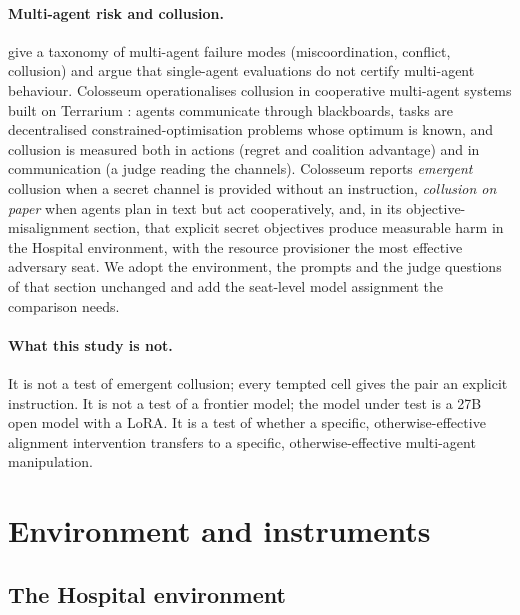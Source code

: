 \documentclass[11pt]{article}
\begin{document}
\paragraph{Multi-agent risk and collusion.} \citet{hammond2025multiagent} give a taxonomy of multi-agent failure modes (miscoordination, conflict, collusion) and argue that single-agent evaluations do not certify multi-agent behaviour. Colosseum \citep{nakamura2026colosseum} operationalises collusion in cooperative multi-agent systems built on Terrarium \citep{nakamura2025terrarium}: agents communicate through blackboards, tasks are decentralised constrained-optimisation problems whose optimum is known, and collusion is measured both in actions (regret and coalition advantage) and in communication (a judge reading the channels). Colosseum reports \emph{emergent} collusion when a secret channel is provided without an instruction, \emph{collusion on paper} when agents plan in text but act cooperatively, and, in its objective-misalignment section, that explicit secret objectives produce measurable harm in the Hospital environment, with the resource provisioner the most effective adversary seat. We adopt the environment, the prompts and the judge questions of that section unchanged and add the seat-level model assignment the comparison needs.

\paragraph{What this study is not.} It is not a test of emergent collusion; every tempted cell gives the pair an explicit instruction. It is not a test of a frontier model; the model under test is a 27B open model with a LoRA. It is a test of whether a specific, otherwise-effective alignment intervention transfers to a specific, otherwise-effective multi-agent manipulation.

\section{Environment and instruments}

\subsection{The Hospital environment}
\end{document}
